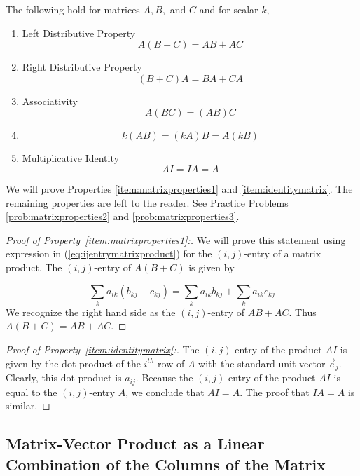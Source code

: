 \documentclass{ximera}
\begin{document}
\begin{theorem}\label{th:propertiesofmatrixmultiplication}
The following hold for matrices $A,B,$ and $C$ and for scalar $k$,
\begin{enumerate}
\item \label{item:matrixproperties1} Left Distributive Property
$$A\left( B+C\right) =AB +AC$$
\item\label{item:matrixproperties2} Right Distributive Property
$$\left( B+C\right) A=BA+CA$$
\item \label{item:matrixproperties3} Associativity
$$A\left( BC\right) =\left( AB\right) C$$
\item\label{item:matrixproperties4}
$$k(AB)=(kA)B=A(kB)$$
\item \label{item:identitymatrix} Multiplicative Identity
$$AI=IA=A$$
\end{enumerate}
\end{theorem}
We will prove Properties \ref{item:matrixproperties1} and \ref{item:identitymatrix}.  The remaining properties are left to the reader. See Practice Problems \ref{prob:matrixproperties2} and \ref{prob:matrixproperties3}.
\begin{proof}[Proof of Property~\ref{item:matrixproperties1}:]
We will prove this statement using expression in (\ref{eq:ijentrymatrixproduct}) for the $(i,j)$-entry of a matrix product. The $(i,j)$-entry of $A(B+C)$ is given by

$$
\sum_{k}a_{ik}( b_{kj}+c_{kj})=\sum_{k}a_{ik}b_{kj}+\sum_{k}a_{ik}c_{kj}
$$
We recognize the right hand side as the $(i,j)$-entry of $AB+AC$.
Thus $A(B+C) =AB+AC$. 
\end{proof}
\begin{proof}[Proof of Property~\ref{item:identitymatrix}:]
The $(i,j)$-entry of the product $AI$ is given by the dot product of the $i^{th}$ row of $A$ with the standard unit vector $\vec{e}_j$.  Clearly, this dot product is $a_{ij}$.  Because the $(i,j)$-entry of the product $AI$ is equal to the $(i,j)$-entry $A$, we conclude that $AI=A$.  The proof that $IA=A$ is similar.
\end{proof}

\subsection*{Matrix-Vector Product as a Linear Combination of the Columns of the Matrix}
\end{document}
